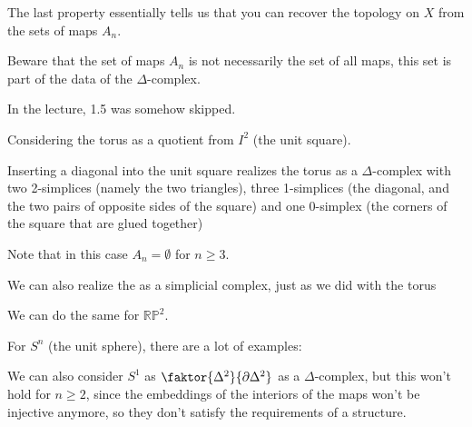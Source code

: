 \begin{oral}
    The last property essentially tells us that you can recover the topology on $X$ from the sets of maps $A_n$.

    Beware that the set of maps $A_n$ is not necessarily the set of all maps, this set is part of the data of the $\Delta$-complex.
\end{oral}

\begin{placeholder}
    In the lecture, 1.5 was somehow skipped.
\end{placeholder}

\begin{example}\label{ex:delta-complex-torus}
    Considering the torus as a quotient from $I^2$ (the unit square).


    Inserting a diagonal into the unit square realizes the torus as a $\Delta$-complex with two 2-simplices (namely the two triangles), three 1-simplices (the diagonal, and the two pairs of opposite sides of the square) and one 0-simplex (the corners of the square that are glued together)

    Note that in this case $A_n = \emptyset$ for $n\geq 3$.
\end{example}

\begin{example*}\label{ex:klein-bottle-delta-complex}
    We can also realize the  as a simplicial complex, just as we did with the torus
\end{example*}

\begin{example*}\label{ex:delta-complex-projective-space}
    We can do the same for $\mathbb{R}\mathbb{P}^2$.
\end{example*}

\begin{example*}\label{ex:delta-complex-sphere}
    For $S^n$ (the unit sphere), there are a lot of examples:

   
    We can also consider $S^1$ as  $\faktor{\Delta^2}{\partial\Delta^2}$ as a $\Delta$-complex, but this won't hold for $n\geq 2$, since the embeddings of the interiors of the maps won't be injective anymore, so they don't satisfy the requirements of a structure.
\end{example*}


